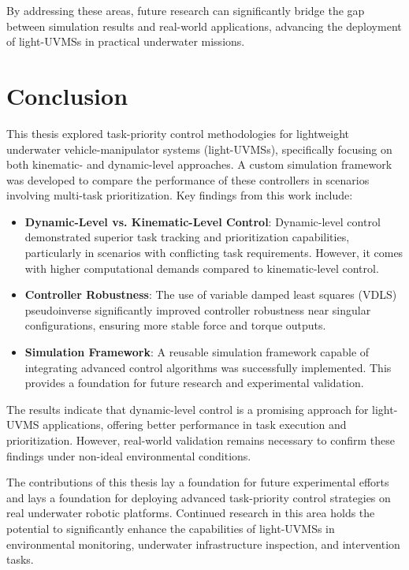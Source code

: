 By addressing these areas, future research can significantly bridge the gap between simulation results and real-world applications, advancing the deployment of light-UVMSs in practical underwater missions.




\section{Conclusion}

This thesis explored task-priority control methodologies for lightweight 
underwater vehicle-manipulator systems (light-UVMSs), specifically focusing on 
both kinematic- and dynamic-level approaches. A custom simulation framework was 
developed to compare the performance of these controllers in scenarios 
involving multi-task prioritization. Key findings from this work include:
\begin{itemize}
    \item \textbf{Dynamic-Level vs. Kinematic-Level Control}: Dynamic-level control 
        demonstrated superior task tracking and prioritization capabilities, 
        particularly in scenarios with conflicting task requirements. However, it comes 
        with higher computational demands compared to kinematic-level control.
    \item \textbf{Controller Robustness}: The use of variable damped least squares (VDLS) pseudoinverse significantly improved controller robustness near singular configurations, ensuring more stable force and torque outputs.
    \item \textbf{Simulation Framework}: A reusable simulation framework capable of integrating advanced control algorithms was successfully implemented. This provides a foundation for future research and experimental validation.
\end{itemize}

The results indicate that dynamic-level control is a promising approach for 
light-UVMS applications, offering better performance in task execution and 
prioritization. However, real-world validation remains necessary to confirm 
these findings under non-ideal environmental conditions.

The contributions of this thesis lay a foundation for future experimental 
efforts and lays a foundation for deploying advanced task-priority control 
strategies on real underwater robotic platforms. Continued research in this 
area holds the potential to significantly enhance the capabilities of 
light-UVMSs in environmental monitoring, underwater infrastructure inspection,
and intervention tasks.
